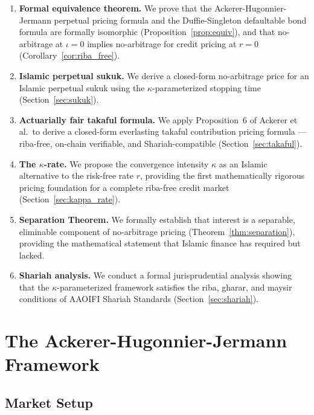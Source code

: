 \documentclass[10pt,twocolumn]{article}
\theoremstyle{plain}
\theoremstyle{definition}
\begin{document}
\begin{enumerate}[leftmargin=*, noitemsep]
\item \textbf{Formal equivalence theorem.} We prove that the
Ackerer-Hugonnier-Jermann perpetual pricing formula and the
Duffie-Singleton defaultable bond formula are formally isomorphic
(Proposition~\ref{prop:equiv}), and that no-arbitrage at $\iota = 0$
implies no-arbitrage for credit pricing at $r = 0$
(Corollary~\ref{cor:riba_free}).

\item \textbf{Islamic perpetual sukuk.} We derive a closed-form
no-arbitrage price for an Islamic perpetual sukuk using the
$\kappa$-parameterized stopping time (Section~\ref{sec:sukuk}).

\item \textbf{Actuarially fair takaful formula.} We apply Proposition~6
of Ackerer et al.\ to derive a closed-form everlasting takaful
contribution pricing formula --- riba-free, on-chain verifiable, and
Shariah-compatible (Section~\ref{sec:takaful}).

\item \textbf{The $\kappa$-rate.} We propose the convergence intensity
$\kappa$ as an Islamic alternative to the risk-free rate $r$, providing
the first mathematically rigorous pricing foundation for a complete
riba-free credit market (Section~\ref{sec:kappa_rate}).

\item \textbf{Separation Theorem.} We formally establish that interest
is a separable, eliminable component of no-arbitrage pricing
(Theorem~\ref{thm:separation}), providing the mathematical statement
that Islamic finance has required but lacked.

\item \textbf{Shariah analysis.} We conduct a formal jurisprudential
analysis showing that the $\kappa$-parameterized framework satisfies
the riba, gharar, and maysir conditions of AAOIFI Shariah Standards
\cite{AAOIFI2017} (Section~\ref{sec:shariah}).
\end{enumerate}

\section{The Ackerer-Hugonnier-Jermann Framework}
\label{sec:ahj}

\subsection{Market Setup}
\end{document}
